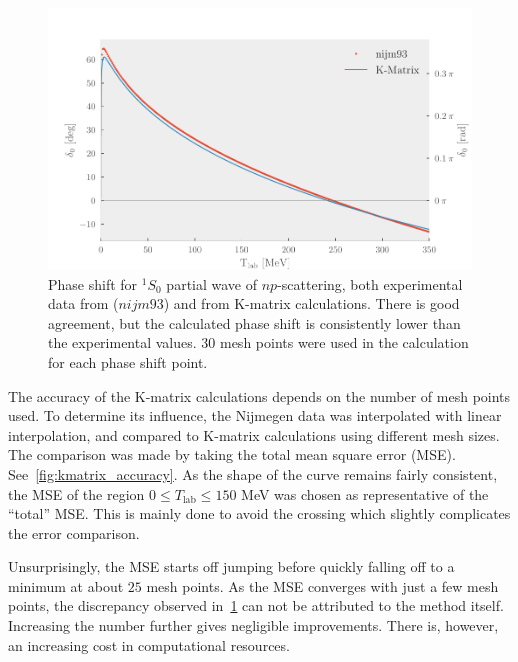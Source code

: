 \begin{figure}[ht!]
  \centering
  \includegraphics[]{Figures/kmatrix.pdf}
  \caption{\label{fig:kmatrix}Phase shift for \(^{1}S_{0}\) partial wave of
    \(np\)-scattering, both experimental data from\cite{PhysRevC.48.792}
     (\(nijm93\)) and from K-matrix calculations. There is good agreement, but the
  calculated phase shift is consistently lower than the experimental
  values. 30 mesh points were used in the calculation for each phase shift point.}
\end{figure}

The accuracy of the K-matrix calculations depends on the number of mesh points
used. To determine its influence, the Nijmegen data was interpolated with linear
interpolation, and compared to K-matrix calculations using different mesh sizes.
The comparison was made by taking the total mean square error (MSE).
See~\cref{fig:kmatrix_accuracy}. As the shape of the curve remains fairly
consistent, the MSE of the region \(0\le T_{\text{lab}} \le 150\) MeV was chosen as
representative of the ``total'' MSE. This is mainly done to avoid the crossing
which slightly complicates the error comparison.

Unsurprisingly, the MSE starts off jumping before quickly falling off to a
minimum at about \(25\) mesh points.  As the MSE converges with just a few mesh points, the
discrepancy observed in~\cref{fig:kmatrix} can not be attributed to the method
itself. Increasing the number further gives
negligible improvements. There is, however, an increasing cost in computational
resources.


